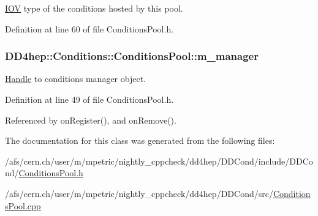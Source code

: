 \hyperlink{class_d_d4hep_1_1_i_o_v}{IOV} type of the conditions hosted by this pool. 

Definition at line 60 of file ConditionsPool.h.\hypertarget{class_d_d4hep_1_1_conditions_1_1_conditions_pool_aae8c23b1a47bad8034196316a2fd41c9}{
\subsubsection[{m\_\-manager}]{ {\bf DD4hep::Conditions::ConditionsPool::m\_\-manager}}}
\label{class_d_d4hep_1_1_conditions_1_1_conditions_pool_aae8c23b1a47bad8034196316a2fd41c9}


\hyperlink{class_d_d4hep_1_1_handle}{Handle} to conditions manager object. 

Definition at line 49 of file ConditionsPool.h.

Referenced by onRegister(), and onRemove().

The documentation for this class was generated from the following files:\begin{DoxyCompactItemize}
\item 
/afs/cern.ch/user/m/mpetric/nightly\_\-cppcheck/dd4hep/DDCond/include/DDCond/\hyperlink{_conditions_pool_8h}{ConditionsPool.h}\item 
/afs/cern.ch/user/m/mpetric/nightly\_\-cppcheck/dd4hep/DDCond/src/\hyperlink{_conditions_pool_8cpp}{ConditionsPool.cpp}\end{DoxyCompactItemize}
